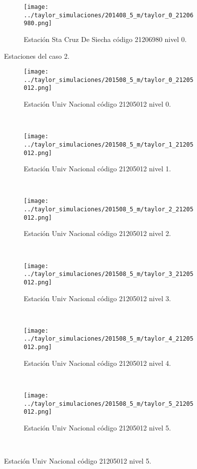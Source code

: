 \begin{figure}[H]

\begin{subfigure}[normla]{0.4\textwidth}
\caption{Estación Sta Cruz De Siecha  código 21206980 nivel 0.}
\texttt{[image: ../taylor\_simulaciones/201408\_5\_m/taylor\_0\_21206980.png]}
\end{subfigure}

\caption{Estaciones del caso 2.}
\label{estaciones_caso1}
\end{figure}

\newpage




\begin{figure}[h]

\begin{subfigure}[normla]{0.4\textwidth}
\caption{Estación Univ Nacional  código 21205012 nivel 0.}
\texttt{[image: ../taylor\_simulaciones/201508\_5\_m/taylor\_0\_21205012.png]}
\end{subfigure}
~
\begin{subfigure}[normla]{0.4\textwidth}
\caption{Estación Univ Nacional  código 21205012 nivel 1.}
\texttt{[image: ../taylor\_simulaciones/201508\_5\_m/taylor\_1\_21205012.png]}
\end{subfigure}
~
\begin{subfigure}[normla]{0.4\textwidth}
\caption{Estación Univ Nacional  código 21205012 nivel 2.}
\texttt{[image: ../taylor\_simulaciones/201508\_5\_m/taylor\_2\_21205012.png]}
\end{subfigure}
~
\begin{subfigure}[normla]{0.4\textwidth}
\caption{Estación Univ Nacional  código 21205012 nivel 3.}
\texttt{[image: ../taylor\_simulaciones/201508\_5\_m/taylor\_3\_21205012.png]}
\end{subfigure}
~
\begin{subfigure}[normla]{0.4\textwidth}
\caption{Estación Univ Nacional  código 21205012 nivel 4.}
\texttt{[image: ../taylor\_simulaciones/201508\_5\_m/taylor\_4\_21205012.png]}
\end{subfigure}
~
\begin{subfigure}[normla]{0.4\textwidth}
\caption{Estación Univ Nacional  código 21205012 nivel 5.}
\texttt{[image: ../taylor\_simulaciones/201508\_5\_m/taylor\_5\_21205012.png]}
\end{subfigure}
~
\end{figure}
           
